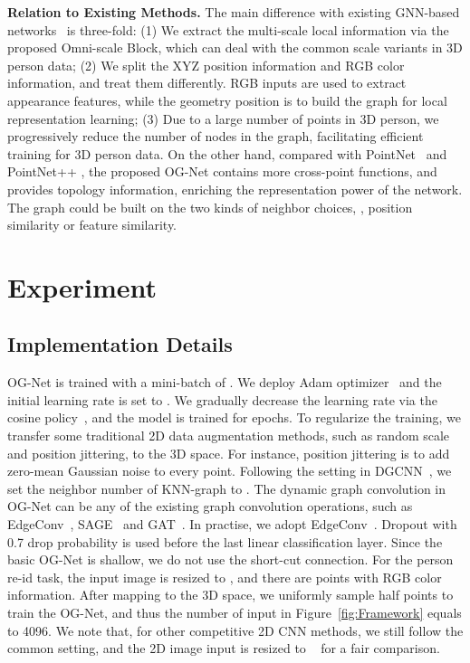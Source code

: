\noindent\textbf{Relation to Existing Methods.} 
The main difference with existing GNN-based networks~\cite{wang2019dynamic,yang2018foldingnet} is three-fold: (1) We extract the multi-scale local information via the proposed Omni-scale Block, which can deal with the common scale variants in 3D person data; (2) We split the XYZ position information and RGB color information, and treat them differently. RGB inputs are used to extract appearance features, while the geometry position is to build the graph for local representation learning; (3) Due to a large number of points in 3D person, we progressively reduce the number of nodes in the graph, facilitating efficient training for 3D person data. 
On the other hand, compared with PointNet~\cite{qi2017pointnet} and PointNet++ \cite{qi2017pointnet++}, the proposed OG-Net contains more cross-point functions, and provides topology information, enriching the representation power of the network. The graph could be built on the two kinds of neighbor choices, \ie, position similarity or feature similarity.


\section{Experiment}
\subsection{Implementation Details}  OG-Net is trained with a mini-batch of . We deploy Adam optimizer~\cite{kingma2014adam} and the initial learning rate is set to . We gradually decrease the learning rate via the cosine policy~\cite{loshchilov2016sgdr}, and the model is trained for  epochs. To regularize the training, we transfer some traditional 2D data augmentation methods, such as random scale and position jittering, to the 3D space. For instance, position jittering is to add zero-mean Gaussian noise to every point. Following the setting in DGCNN~\cite{wang2019dynamic}, we set the neighbor number of KNN-graph to . The dynamic graph convolution in OG-Net can be any of the existing graph convolution operations, such as EdgeConv~\cite{wang2019dynamic}, SAGE~\cite{hamilton2017inductive} and GAT~\cite{xu2018powerful}. In practise, we adopt EdgeConv~\cite{wang2019dynamic}. Dropout with 0.7 drop probability is used before the last linear classification layer. Since the basic OG-Net is shallow, we do not use the short-cut connection. For the person re-id task, the input image is resized to , and there are  points with RGB color information. After mapping to the 3D space, we uniformly sample half points to train the OG-Net, and thus the number of input  in Figure~\ref{fig:Framework} equals to 4096. We note that, for other competitive 2D CNN methods, we still follow the common setting, and the 2D image input is resized to  ~\cite{sun2017beyond,zheng2019joint} for a fair comparison.  


